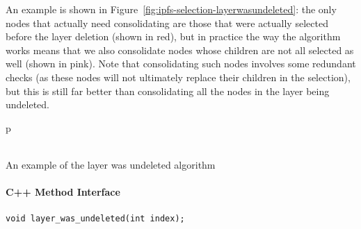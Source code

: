 An example is shown in Figure~\ref{fig:ipfs-selection-layerwasundeleted}: the only nodes that actually need consolidating are those that were actually selected before the layer deletion (shown in red), but in practice the way the algorithm works means that we also consolidate nodes whose children are not all selected as well (shown in pink). Note that consolidating such nodes involves some redundant checks (as these nodes will not ultimately replace their children in the selection), but this is still far better than consolidating all the nodes in the layer being undeleted.

\begin{stusubfig}{p}
	\\
	\\
\caption{An example of the layer was undeleted algorithm}
\label{fig:ipfs-selection-layerwasundeleted}
\end{stusubfig}

\paragraph{C++ Method Interface}

\begin{lstlisting}[style=Prototype]
void layer_was_undeleted(int index);
\end{lstlisting}

